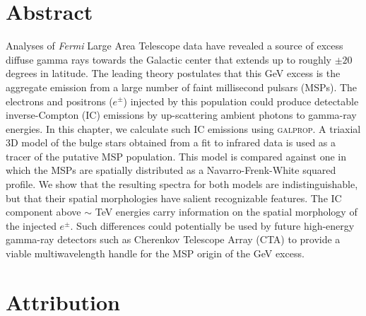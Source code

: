 \documentclass[doublespace,nopageskip]{VTthesis} %
\begin{document}
\section{Abstract}

Analyses of \textit{Fermi} Large Area Telescope data have revealed a source of excess diffuse gamma rays towards the Galactic center that extends up to roughly $\pm 20$ degrees in latitude. The leading theory postulates that this GeV excess is the aggregate emission from a large number of faint millisecond pulsars (MSPs). The electrons and positrons ($e^{\pm}$) injected by this population could produce detectable inverse-Compton (IC) emissions by up-scattering ambient photons to gamma-ray energies. In this chapter, we calculate such IC emissions using \textsc{galprop}. A triaxial 3D model of the bulge stars obtained from a fit to infrared data is used as a tracer of the putative MSP population. This model is compared against one in which the MSPs are spatially distributed as a Navarro-Frenk-White squared profile. We show that the resulting spectra for both models are indistinguishable, but that their spatial morphologies have salient recognizable features. The IC component above $\sim $ TeV energies carry information on the spatial morphology of the injected $e^\pm$. Such differences could potentially be used by future high-energy gamma-ray detectors such as Cherenkov Telescope Array (CTA) to provide a viable multiwavelength handle for the MSP origin of the GeV excess.

\section{Attribution}
\end{document}

